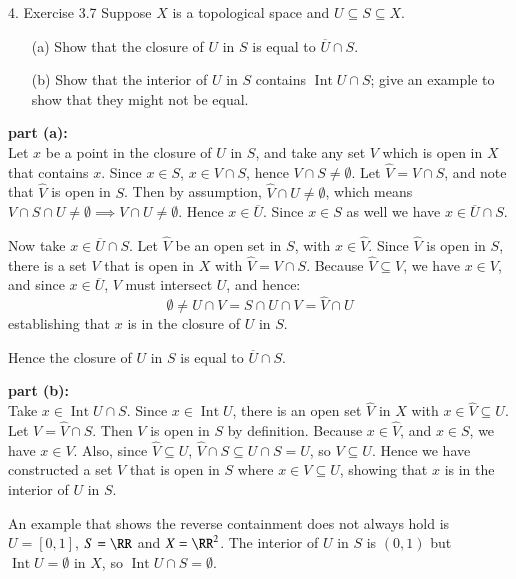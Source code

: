 \documentclass{homework}
\newcommand{\nextprob}{\newpage}
\DeclareMathOperator{\Int}{\mathrm{Int}}
\begin{document}
\nextprob
\begin{exercise}{4. Exercise 3.7}
Suppose $X$ is a topological space and $U\subseteq S\subseteq X$.
\begin{itemize}
\item[(a)] Show that the closure of $U$ in $S$ is equal to $\overline{U}\cap S$.
\item[(b)] Show that the interior of $U$ in $S$ contains $\Int U\cap S$; give an
example to show that they might not be equal.
\end{itemize}
\end{exercise}
\solution
%
\textbf{part (a):}\\
Let $x$ be a point in the closure of $U$ in $S$, and take any set $V$ which is
open in $X$ that contains $x$.  Since $x\in S$, $x\in V\cap S$, hence
$V\cap S\ne\emptyset$.  Let $\hat V=V\cap S$, and note that $\hat V$ is
open in $S$.  Then by assumption, $\hat V\cap U\ne\emptyset$,
which means $V\cap S\cap U\ne\emptyset\implies V\cap U\ne\emptyset$.
Hence $x\in\overline{U}$.  Since $x\in S$ as well we have $x\in\overline{U}\cap S$.

Now take $x\in\overline{U}\cap S$.
Let $\hat V$ be an open set in $S$, with $x\in \hat V$.  Since $\hat V$ is open
in $S$, there is a set $V$ that is open in $X$ with $\hat V=V\cap S$.  Because
$\hat V\subseteq V$, we have $x\in V$, and since $x\in\overline{U}$,
$V$ must intersect $U$, and hence:
$$ \emptyset\ne U\cap V=S\cap U\cap V=\hat V\cap U$$
establishing that $x$ is in the closure of $U$ in $S$.

Hence the closure of $U$ in $S$ is equal to $\overline{U}\cap S$.

\textbf{part (b):}\\
Take $x\in \Int U\cap S$.  Since $x\in\Int U$, there is an open set $\hat V$
in $X$ with $x\in\hat V\subseteq U$.  Let $V=\hat V\cap S$.  Then $V$ is
open in $S$ by definition.  Because $x\in\hat V$,
and $x\in S$, we have $x\in V$.  Also, since $\hat V\subseteq U$,
$\hat V\cap S \subseteq U\cap S=U$, so $V\subseteq U$.  Hence we have
constructed a set $V$ that is open in $S$ where $x\in V\subseteq U$, showing
that $x$ is in the interior of $U$ in $S$.

An example that shows the reverse containment does not always hold is
$U=[0,1]$, $S=\RR$ and $X=\RR^2$.  The interior of $U$ in $S$ is
$(0,1)$ but $\Int U = \emptyset$ in $X$, so $\Int U \cap S=\emptyset$.
\end{document}
